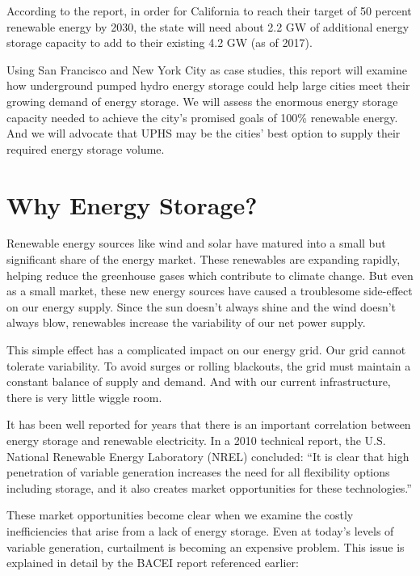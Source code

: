 \documentclass[hidelinks,12pt,a4paper]{article}
\begin{document}
According to the report, in order for California to reach their target of 50 percent renewable energy by 2030, the state will need about 2.2 GW of additional energy storage capacity to add to their existing 4.2 GW (as of 2017).\cite{EnergyStorageCaliforniaClimateandEnergyGoals}


Using San Francisco and New York City as case studies, this report will examine how underground pumped hydro energy storage could help large cities meet their growing demand of energy storage. We will assess the enormous energy storage capacity needed to achieve the city's promised goals of 100\% renewable energy. And we will advocate that UPHS may be the cities' best option to supply their required energy storage volume.

\pagebreak[1]
\section{Why Energy Storage?}
Renewable energy sources like wind and solar have matured into a small but significant share of the energy market. These renewables are expanding rapidly, helping reduce the greenhouse gases which contribute to climate change. But even as a small market, these new energy sources have caused a troublesome side-effect on our energy supply. Since the sun doesn’t always shine and the wind doesn’t always blow, renewables increase the variability of our net power supply.

This simple effect has a complicated impact on our energy grid. Our grid cannot tolerate variability. To avoid surges or rolling blackouts, the grid must maintain a constant balance of supply and demand. And with our current infrastructure, there is very little wiggle room.

It has been well reported for years that there is an important correlation between energy storage and renewable electricity. In a 2010 technical report, the U.S. National Renewable Energy Laboratory (NREL) concluded: “It is clear that high penetration of variable generation increases the need for all flexibility options including storage, and it also creates market opportunities for these technologies.” \cite{TheRoleOfEnergyStorageWithRenewableElectricityGeneration}

These market opportunities become clear when we examine the costly inefficiencies that arise from a lack of energy storage. Even at today's levels of variable generation, curtailment is becoming an expensive problem. This issue is explained in detail by the BACEI report referenced earlier:
\end{document}
